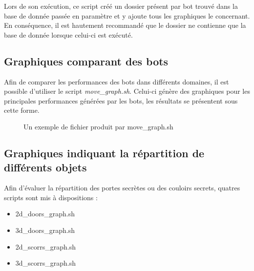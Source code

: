 \documentclass[10pt,a4paper]{report}
\begin{document}
Lors de son exécution, ce script créé un dossier présent par bot trouvé dans
la base de donnée passée en paramètre et y ajoute tous les graphiques le
concernant. En conséquence, il est hautement recommandé que le dossier ne
contienne que la base de donnée lorsque celui-ci est exécuté.

\subsection{Graphiques comparant des bots}
Afin de comparer les performances des bots dans différents domaines, il est
possible d'utiliser le script \emph{move\_graph.sh}. Celui-ci génère des
graphiques pour les principales performances générées par les bots, les
résultats se présentent sous cette forme.

\begin{figure}[H]
  \caption{\label{fig:move_graph} Un exemple de fichier produit par move\_graph.sh}
\end{figure}

\subsection{Graphiques indiquant la répartition de différents objets}
Afin d'évaluer la répartition des portes secrètes ou des couloirs secrets,
quatres scripts sont mis à dispositions :

\begin{itemize}
\item 2d\_doors\_graph.sh
\item 3d\_doors\_graph.sh
\item 2d\_scorrs\_graph.sh
\item 3d\_scorrs\_graph.sh
\end{itemize}
\end{document}
